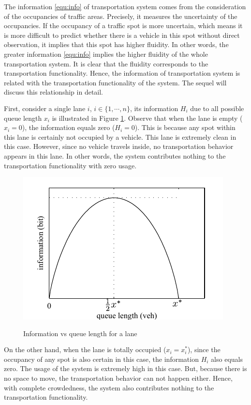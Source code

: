 \documentclass[preprint,authoryear,12pt]{elsarticle}
\begin{document}
The information \eqref{equ:info} of transportation system comes from the consideration of the occupancies of traffic areas. Precisely, it measures the uncertainty of the occupancies. If the occupancy of a traffic spot is more uncertain, which means it is more difficult to predict whether there is a vehicle in this spot without direct observation, it implies that this spot has higher fluidity. In other words, the greater information \eqref{equ:info} implies the higher fluidity of the whole transportation system. It is clear that the fluidity corresponds to the transportation functionality. Hence, the information of transportation system is related with the transportation functionality of the system. The sequel will discuss this relationship in detail.

First, consider a single lane $i$, $i\in\{1,\cdots,n\}$, its information $H_i$ due to all possible queue length $x_i$ is illustrated in Figure \ref{fig:info_lane}. Observe that when the lane is empty ($x_i=0$), the information equals zero ($H_i=0$). This is because any spot within this lane is certainly not occupied by a vehicle. This lane is extremely clean in this case. However, since no vehicle travels inside, no transportation behavior appears in this lane. In other words, the system contributes nothing to the transportation functionality with zero usage.

\begin{figure}[ht]
  \centering
  \includegraphics{pics/lane}\\
  \caption{Information vs queue length for a lane}
  \label{fig:info_lane}
\end{figure}

On the other hand, when the lane is totally occupied ($x_i=x_i^*$), since the occupancy of any spot is also certain in this case, the information $H_i$ also equals zero. The usage of the system is extremely high in this case. But, because there is no space to move, the transportation behavior can not happen either. Hence, with complete crowdedness, the system also contributes nothing to the transportation functionality.
\end{document}
